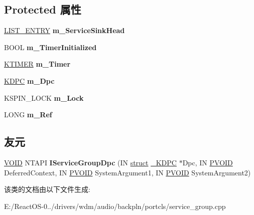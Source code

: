 \subsection*{Protected 属性}
\begin{DoxyCompactItemize}
\item 
\mbox{\label{class_c_service_group_afaa8c598fa7cb611a2ad2783aa5e2ae0}} 
\hyperlink{struct___l_i_s_t___e_n_t_r_y}{L\+I\+S\+T\+\_\+\+E\+N\+T\+RY} {\bfseries m\+\_\+\+Service\+Sink\+Head}
\item 
\mbox{\label{class_c_service_group_ae6282db15ca936c7c41d83b01b9be669}} 
B\+O\+OL {\bfseries m\+\_\+\+Timer\+Initialized}
\item 
\mbox{\label{class_c_service_group_a405ca6d993e6f27efc0cf9a9879fb9e4}} 
\hyperlink{struct___k_t_i_m_e_r}{K\+T\+I\+M\+ER} {\bfseries m\+\_\+\+Timer}
\item 
\mbox{\label{class_c_service_group_ab43f125b6f3d6d00ab3428f3d93527d1}} 
\hyperlink{struct___k_d_p_c}{K\+D\+PC} {\bfseries m\+\_\+\+Dpc}
\item 
\mbox{\label{class_c_service_group_ab2a2469af4a6cfff77db29f03b05015b}} 
K\+S\+P\+I\+N\+\_\+\+L\+O\+CK {\bfseries m\+\_\+\+Lock}
\item 
\mbox{\label{class_c_service_group_a556a7b92a7c1df9f49d2de401fb50621}} 
L\+O\+NG {\bfseries m\+\_\+\+Ref}
\end{DoxyCompactItemize}
\subsection*{友元}
\begin{DoxyCompactItemize}
\item 
\mbox{\label{class_c_service_group_a9e9ab14dc885e6480cc89986282385d9}} 
\hyperlink{interfacevoid}{V\+O\+ID} N\+T\+A\+PI {\bfseries I\+Service\+Group\+Dpc} (IN \hyperlink{interfacestruct}{struct} \hyperlink{struct___k_d_p_c}{\+\_\+\+K\+D\+PC} $\ast$Dpc, IN \hyperlink{interfacevoid}{P\+V\+O\+ID} Deferred\+Context, IN \hyperlink{interfacevoid}{P\+V\+O\+ID} System\+Argument1, IN \hyperlink{interfacevoid}{P\+V\+O\+ID} System\+Argument2)
\end{DoxyCompactItemize}


该类的文档由以下文件生成\+:\begin{DoxyCompactItemize}
\item 
E\+:/\+React\+O\+S-\/0../drivers/wdm/audio/backpln/portcls/service\+\_\+group.\+cpp\end{DoxyCompactItemize}
